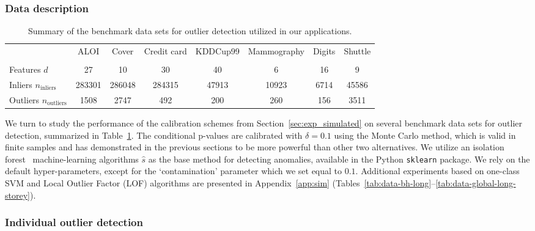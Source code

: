 \documentclass[11pt]{article}
\begin{document}
\subsubsection{Data description}

\begin{table}[!htb]
\centering
\small
\caption{\label{tab:datasets}Summary of the benchmark data sets for outlier detection utilized in our applications.}
\begin{tabular}{@{}lccccccc@{}}
\toprule
                  & ALOI  & Cover  & Credit card & KDDCup99 & Mammography & Digits & Shuttle \\
                         & \cite{campos2016evaluation,aloi}   & \cite{cover}    & \cite{creditcard}         & \cite{campos2016evaluation,KDDCup99}      & \cite{mammography}         & \cite{pendigits}    & \cite{shuttle}     \\ \midrule
Features $d$      & 27    & 10     & 30          & 40       & 6           & 16     & 9       \\
Inliers ${n_\text{inliers}}$   & 283301 & 286048 & 284315      & 47913    & 10923       & 6714   & 45586   \\
Outliers ${n_\text{outliers}}$ & 1508  & 2747   & 492         & 200      & 260         & 156    & 3511   \\ \bottomrule
\end{tabular}
\end{table}

We turn to study the performance of the calibration schemes from Section~\ref{sec:exp_simulated} on several benchmark data sets for outlier detection, summarized in Table~\ref{tab:datasets}. The conditional p-values are calibrated with $\delta = 0.1$ using the Monte Carlo method, which is valid in finite samples and has demonstrated in the previous sections to be more powerful than other two alternatives.
We utilize an isolation forest~\cite{liu2008isolation} machine-learning algorithms $\hat{s}$ as the base method for detecting anomalies, available in the Python \texttt{sklearn} package. We rely on the default hyper-parameters, except for the `contamination' parameter which we set equal to $0.1$. Additional experiments based on one-class SVM and Local Outlier Factor (LOF) algorithms are presented in Appendix~\ref{app:sim} (Tables~\ref{tab:data-bh-long}--\ref{tab:data-global-long-storey}).

\subsubsection{Individual outlier detection}\label{sec:real_individual_outlier_detection}
\end{document}

